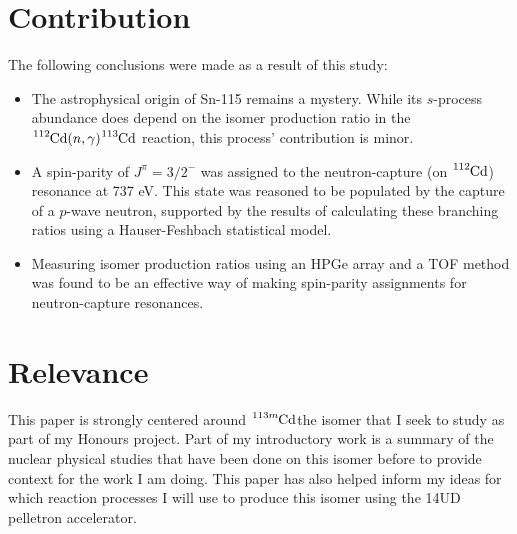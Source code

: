 \documentclass[12pt,a4paper]{article}
\begin{document}
\section*{Contribution}
The following conclusions were made as a result of this study:
\begin{itemize}
	\item The astrophysical origin of Sn-115 remains a mystery. While its $s$-process abundance does depend on the isomer production ratio in the $\ce{^{112}Cd}(n,\gamma)\ce{^{113}Cd}$ reaction, this process' contribution is minor.
	\item A spin-parity of $J^\pi = 3/2^-$ was assigned to the neutron-capture (on $\ce{^{112}Cd}$) resonance at 737 eV. This state was reasoned to be populated by the capture of a $p$-wave neutron, supported by the results of calculating these branching ratios using a Hauser-Feshbach statistical model.
	\item Measuring isomer production ratios using an HPGe array and a TOF method was found to be an effective way of making spin-parity assignments for neutron-capture resonances.
\end{itemize}


\section*{Relevance}
This paper is strongly centered around $\ce{^{113m}Cd}$\textemdash the isomer that I seek to study as part of my Honours project. Part of my introductory work is a summary of the nuclear physical studies that have been done on this isomer before to provide context for the work I am doing. This paper has also helped inform my ideas for which reaction processes I will use to produce this isomer using the 14UD pelletron accelerator.
\end{document}
